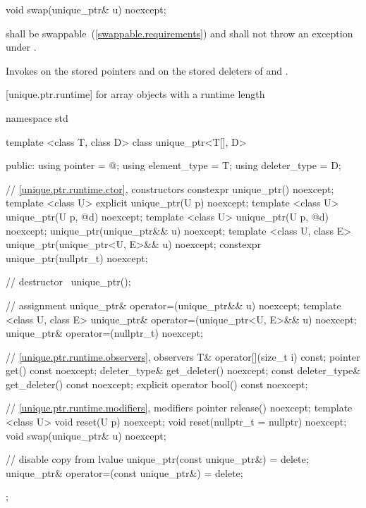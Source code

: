 %
\begin{itemdecl}
void swap(unique_ptr& u) noexcept;
\end{itemdecl}

\begin{itemdescr}
\pnum
\requires {} shall be
swappable~(\ref{swappable.requirements}) and shall
not throw an exception
under .

\pnum
\effects Invokes  on the stored pointers and on the stored
deleters of  and .
\end{itemdescr}

[unique.ptr.runtime]{ for array objects with a runtime length}

%
\begin{codeblock}
namespace std {
  template <class T, class D> class unique_ptr<T[], D> {
  public:
    using pointer      = @\seebelow@;
    using element_type = T;
    using deleter_type = D;

    // \ref{unique.ptr.runtime.ctor}, constructors
    constexpr unique_ptr() noexcept;
    template <class U> explicit unique_ptr(U p) noexcept;
    template <class U> unique_ptr(U p, @\seebelow@ d) noexcept;
    template <class U> unique_ptr(U p, @\seebelow@ d) noexcept;
    unique_ptr(unique_ptr&& u) noexcept;
    template <class U, class E>
      unique_ptr(unique_ptr<U, E>&& u) noexcept;
    constexpr unique_ptr(nullptr_t) noexcept;

    // destructor
    ~unique_ptr();

    // assignment
    unique_ptr& operator=(unique_ptr&& u) noexcept;
    template <class U, class E>
      unique_ptr& operator=(unique_ptr<U, E>&& u) noexcept;
    unique_ptr& operator=(nullptr_t) noexcept;

    // \ref{unique.ptr.runtime.observers}, observers
    T& operator[](size_t i) const;
    pointer get() const noexcept;
    deleter_type& get_deleter() noexcept;
    const deleter_type& get_deleter() const noexcept;
    explicit operator bool() const noexcept;

    // \ref{unique.ptr.runtime.modifiers}, modifiers
    pointer release() noexcept;
    template <class U> void reset(U p) noexcept;
    void reset(nullptr_t = nullptr) noexcept;
    void swap(unique_ptr& u) noexcept;

    // disable copy from lvalue
    unique_ptr(const unique_ptr&) = delete;
    unique_ptr& operator=(const unique_ptr&) = delete;
  };
}
\end{codeblock}

